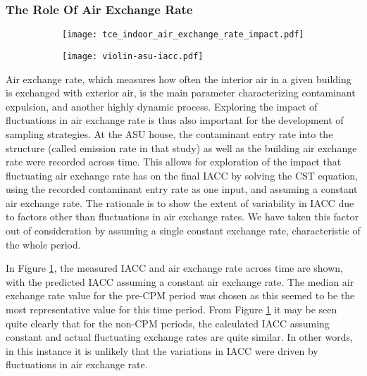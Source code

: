 \documentclass[journal=esthag,manuscript=article]{achemso}
\begin{document}
\subsubsection{The Role Of Air Exchange Rate}
\begin{figure}[htb!]
  \caption{Comparison between the recorded  and the calculated TCE in indoor air at the ASU house, assuming constant air exchange rate. \ref{fig:asu-iacc-ae-overview} shows the TCE in indoor air across time as well as the exchange rate. \ref{fig:violin-iacc-aet} shows the distribution of these values for three periods.}
  \label{fig:ae-analysis}
  \begin{subfigure}{\textwidth}
    \caption{ }
    \label{fig:asu-iacc-ae-overview}
    \texttt{[image: tce\_indoor\_air\_exchange\_rate\_impact.pdf]}
  \end{subfigure}
  \begin{subfigure}{0.75\textwidth}
    \caption{ }
    \label{fig:violin-iacc-aet}
    \texttt{[image: violin-asu-iacc.pdf]}
  \end{subfigure}
\end{figure}
Air exchange rate, which measures how often the interior air in a given building is exchanged with exterior air, is the main parameter characterizing contaminant expulsion, and another highly dynamic process.
Exploring the impact of fluctuations in air exchange rate is thus also important for the development of sampling strategies.
At the ASU house, the contaminant entry rate into the structure (called emission rate in that study) as well as the building air exchange rate were recorded across time.
This allows for exploration of the impact that fluctuating air exchange rate has on the final IACC by solving the CST equation, using the recorded contaminant entry rate as one input, and assuming a constant air exchange rate.
The rationale is to show the extent of variability in IACC due to factors other than fluctuations in air exchange rates.
We have taken this factor out of consideration by assuming a single constant exchange rate, characteristic of the whole period.

In Figure \ref{fig:asu-iacc-ae-overview}, the measured IACC and air exchange rate across time are shown, with the predicted IACC assuming a constant air exchange rate.
The median air exchange rate value for the pre-CPM period was chosen as this seemed to be the most representative value for this time period.
From Figure \ref{fig:asu-iacc-ae-overview} it may be seen quite clearly that for the non-CPM periods, the calculated IACC assuming constant and actual fluctuating exchange rates are quite similar.
In other words, in this instance it is unlikely that the variations in IACC were driven by fluctuations in air exchange rate.
\end{document}
